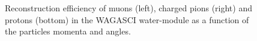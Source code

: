 \begin{figure}[htbp]
\begin{subfigure}{.49\textwidth}
  \end{subfigure}
  \caption{\label{fig:efficiency_particle} Reconstruction efficiency of muons (left), charged pions (right) and protons (bottom) in the WAGASCI water-module as a function of the particles momenta and angles.}
\end{figure}

%


